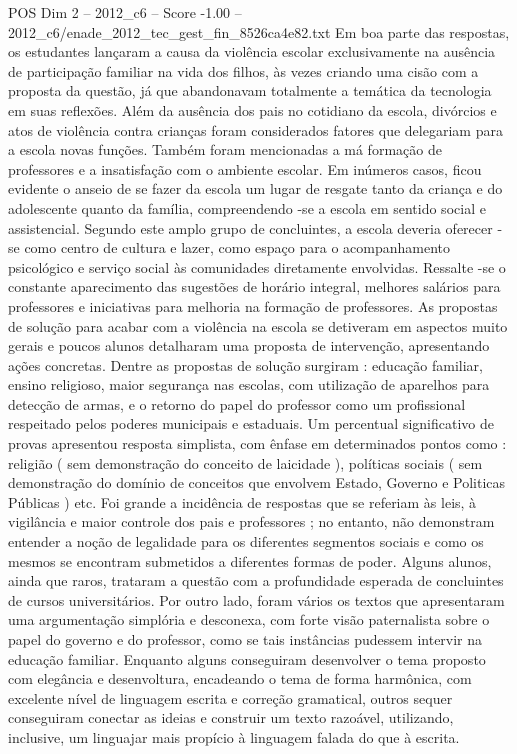 \begin{textsample}{POS Dim 2 – 2012\_c6 – Score -1.00 – 2012\_c6/enade\_2012\_tec\_gest\_fin\_8526ca4e82.txt}
Em boa parte das respostas, os estudantes lançaram a causa da violência escolar exclusivamente na ausência de participação familiar na vida dos filhos, às vezes criando uma cisão com a proposta da questão, já que abandonavam totalmente a temática da tecnologia em suas reflexões.
Além da ausência dos pais no cotidiano da escola, divórcios e atos de violência contra crianças foram considerados fatores que delegariam para a escola novas funções.
Também foram mencionadas a má formação de professores e a insatisfação com o ambiente escolar.
Em inúmeros casos, ficou evidente o anseio de se fazer da escola um lugar de resgate tanto da criança e do adolescente quanto da família, compreendendo -se a escola em sentido social e assistencial.
Segundo este amplo grupo de concluintes, a escola deveria oferecer -se como centro de cultura e lazer, como espaço para o acompanhamento psicológico e serviço social às comunidades diretamente envolvidas.
Ressalte -se o constante aparecimento das sugestões de horário integral, melhores salários para professores e iniciativas para melhoria na formação de professores.
As propostas de solução para acabar com a violência na escola se detiveram em aspectos muito gerais e poucos alunos detalharam uma proposta de intervenção, apresentando ações concretas.
Dentre as propostas de solução surgiram : educação familiar, ensino religioso, maior segurança nas escolas, com utilização de aparelhos para detecção de armas, e o retorno do papel do professor como um profissional respeitado pelos poderes municipais e estaduais.
Um percentual significativo de provas apresentou resposta simplista, com ênfase em determinados pontos como : religião ( sem demonstração do conceito de laicidade ), políticas sociais ( sem demonstração do domínio de conceitos que envolvem Estado, Governo e Politicas Públicas ) etc.
Foi grande a incidência de respostas que se referiam às leis, à vigilância e maior controle dos pais e professores ; no entanto, não demonstram entender a noção de legalidade para os diferentes segmentos sociais e como os mesmos se encontram submetidos a diferentes formas de poder.
Alguns alunos, ainda que raros, trataram a questão com a profundidade esperada de concluintes de cursos universitários.
Por outro lado, foram vários os textos que apresentaram uma argumentação simplória e desconexa, com forte visão paternalista sobre o papel do governo e do professor, como se tais instâncias pudessem intervir na educação familiar.
Enquanto alguns conseguiram desenvolver o tema proposto com elegância e desenvoltura, encadeando o tema de forma harmônica, com excelente nível de linguagem escrita e correção gramatical, outros sequer conseguiram conectar as ideias e construir um texto razoável, utilizando, inclusive, um linguajar mais propício à linguagem falada do que à escrita.

\end{textsample}
